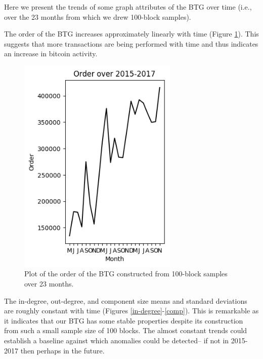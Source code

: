 \documentclass[letterpaper, 10 pt, conference]{ieeeconf}  %
\begin{document}
Here we present the trends of some graph attributes of the BTG over time (i.e., over the 23 months from which we drew 100-block samples).

The order of the BTG increases approximately linearly with time (Figure \ref{order}). This suggests that more transactions are being performed with time and thus indicates an increase in bitcoin activity.

\begin{figure}
\centering
\includegraphics[width=3in]{Plots/Time/order.png}
\caption{\label{order} Plot of the order of the BTG constructed from 100-block samples over 23 months.}
\end{figure}

The in-degree, out-degree, and component size means and standard deviations are roughly constant with time (Figures \ref{in-degree}-\ref{comp}). This is remarkable as it indicates that our BTG has some stable properties despite its construction from such a small sample size of 100 blocks. The almost constant trends could establish a baseline against which anomalies could be detected-- if not in 2015-2017 then perhaps in the future.
\end{document}
